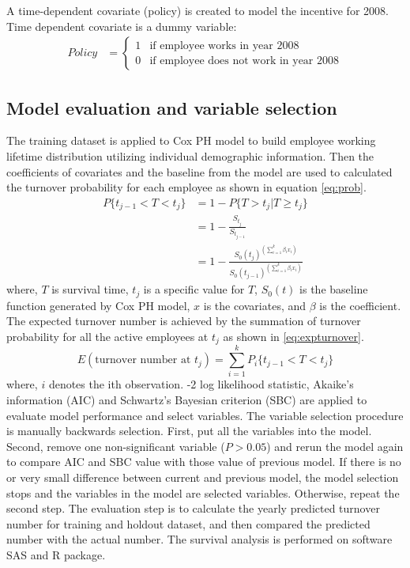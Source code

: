 A time-dependent covariate (policy) is created to model the incentive for 2008. Time dependent covariate is a dummy variable:
\begin{align*}
Policy&=
\begin{cases}
1   &\text{if employee works in year 2008 }\\
0   &\text{if  employee does not work in year 2008}
\end{cases}
\end{align*}

\subsection{Model evaluation and variable selection}
The training dataset is applied to Cox PH model to build employee working lifetime distribution utilizing individual demographic information. Then the coefficients of covariates and the baseline from the model are used to calculated the turnover probability for each employee as shown in equation \ref{eq:prob}. 
\begin{equation}
\label{eq:prob}
\begin{split}%
P\{t_{j-1}<T<t_j\} &=1-P\{T>t_j|T \ge t_j\}\\
&=1-\frac{S_{t_j}}{S_{t_{j-1}}}   \\
&=1-\frac{{S_0(t_j)}^{(\sum_{i=1}^{k}\beta_ix_i)}}{   {S_0(t_{j-1})}^{(\sum_{i=1}^{k}\beta_ix_i)}}
\end{split}
\end{equation}
where, $T$ is survival time, $t_j$ is a specific value for $T$, $S_0(t)$ is the baseline function generated by Cox PH model, $x$ is the covariates, and $\beta$ is the coefficient.
The expected turnover number is achieved by the summation of turnover probability for all the active employees at $t_j$ as shown in \ref{eq:expturnover}.  
\begin{equation}
\label{eq:expturnover}
E(\text{turnover number at } t_j)=\sum_{i=1}^k{P_i\{t_{j-1}<T<t_j\}} 
\end{equation}
where, $i$ denotes the ith observation. -2 log likelihood statistic, Akaike’s information (AIC) and Schwartz’s Bayesian criterion (SBC) are applied to evaluate model performance and select variables. The variable selection procedure is manually backwards selection. First, put all the variables into the model. Second, remove one non-significant variable ($P>0.05$) and rerun the model again to compare AIC and SBC value with those value of previous model. If there is no or very small difference between current and previous model, the model selection stops and the variables in the model are selected variables. Otherwise, repeat the second step. The evaluation step is to calculate the yearly predicted turnover number for training and holdout dataset, and then compared the predicted number with the actual number. The survival analysis is performed on software SAS and R package.
